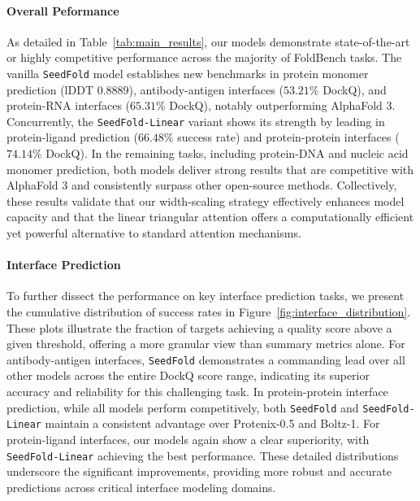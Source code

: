 \documentclass[]{bytedance_seed}
\begin{document}

\paragraph{Overall Peformance} As detailed in Table~\ref{tab:main_results}, our models demonstrate state-of-the-art or highly competitive performance across the majority of FoldBench tasks. The vanilla \texttt{SeedFold} model establishes new benchmarks in protein monomer prediction (lDDT $0.8889$), antibody-antigen interfaces ($53.21\%$ DockQ), and protein-RNA interfaces ($65.31\%$ DockQ), notably outperforming AlphaFold 3. Concurrently, the \texttt{SeedFold-Linear} variant shows its strength by leading in protein-ligand prediction ($66.48\%$ success rate) and protein-protein interfaces ($74.14\%$ DockQ). In the remaining tasks, including protein-DNA and nucleic acid monomer prediction, both models deliver strong results that are competitive with AlphaFold 3 and consistently surpass other open-source methods. Collectively, these results validate that our width-scaling strategy effectively enhances model capacity and that the linear triangular attention offers a computationally efficient yet powerful alternative to standard attention mechanisms.


\paragraph{Interface Prediction}
To further dissect the performance on key interface prediction tasks, we present the cumulative distribution of success rates in Figure~\ref{fig:interface_distribution}. These plots illustrate the fraction of targets achieving a quality score above a given threshold, offering a more granular view than summary metrics alone. For antibody-antigen interfaces, \texttt{SeedFold} demonstrates a commanding lead over all other models across the entire DockQ score range, indicating its superior accuracy and reliability for this challenging task. In protein-protein interface prediction, while all models perform competitively, both \texttt{SeedFold} and \texttt{SeedFold-Linear} maintain a consistent advantage over Protenix-0.5 and Boltz-1. For protein-ligand interfaces, our models again show a clear superiority, with \texttt{SeedFold-Linear} achieving the best performance. These detailed distributions underscore the significant improvements, providing more robust and accurate predictions across critical interface modeling domains.
\end{document}
